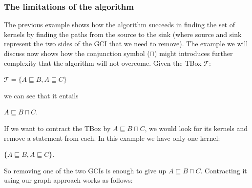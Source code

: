 \subsubsection{The limitations of the algorithm}
The previous example shows how the algorithm succeeds in finding the set of kernels by finding the paths from the source to the sink (where source and sink represent the two sides of the GCI that we need to remove). The example we will discuss now shows how the conjunction symbol ($\sqcap$) might introduces further complexity that the algorithm will not overcome. Given the TBox $\mathcal{T}$:
\begin{center}
$\mathcal{T} = \lbrace A \sqsubseteq B, A \sqsubseteq C \rbrace$
\end{center}
we can see that it entails
\begin{center}
$A \sqsubseteq B \sqcap C$.
\end{center}
If we want to contract the TBox by $A \sqsubseteq B \sqcap C$, we would look for its kernels and remove a statement from each. In this example we have only one kernel:
\begin{center}
$\lbrace A \sqsubseteq B, A \sqsubseteq C \rbrace$.
\end{center}
So removing one of the two GCIs is enough to give up $A \sqsubseteq B \sqcap C$. Contracting it using our graph approach works as follows:

